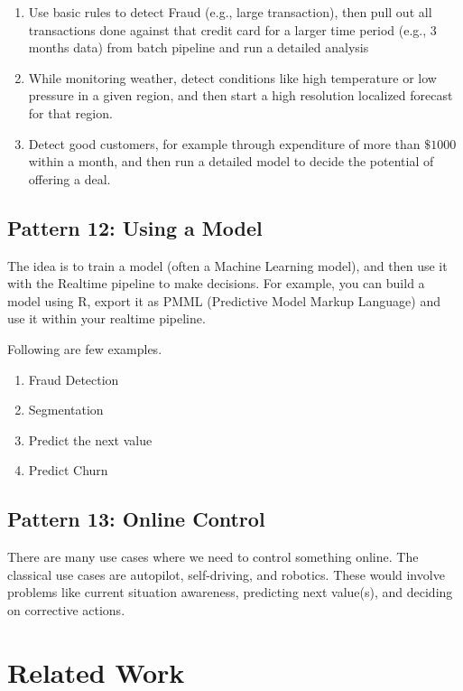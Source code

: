 \documentclass{sig-alternate}
\begin{document}
\begin{enumerate}
\item Use basic rules to detect Fraud (e.g., large transaction), then pull out all transactions done against that credit card for a larger time period (e.g., 3 months data) from batch pipeline and run a detailed analysis 
\item While monitoring weather, detect conditions like high temperature or low pressure in a given region, and then start a high resolution localized forecast for that region. 
\item Detect good customers, for example through expenditure of more than $\$1000$ within a month, and then run a detailed model to decide the potential of offering a deal. 
\end{enumerate}

\subsection{Pattern 12: Using a Model} 
The idea is to train a model (often a Machine Learning model), and then use it with the Realtime pipeline to make decisions. For example, you can build a model using R, export it as PMML (Predictive Model Markup Language) and use it within your realtime pipeline. 

Following are few examples.
\begin{enumerate}
\item Fraud Detection
\item Segmentation 
\item Predict the next value 
\item Predict Churn 
\end{enumerate}


\subsection{Pattern 13: Online Control} 
There are many use cases where we need to control something online. The classical use cases are autopilot, self-driving, and robotics. These would involve problems like current situation awareness, predicting next value(s), and deciding on corrective actions. 


\section{Related Work}
\end{document}
